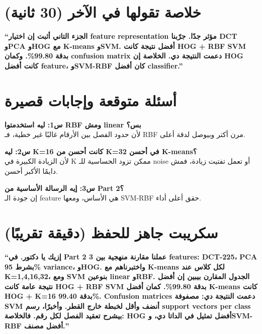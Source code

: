 \documentclass[12pt,a4paper]{article}
\begin{document}
\section*{خلاصة تقولها في الآخر (30 ثانية)}
\textbf{``الجزء التاني أثبت إن اختيار \textenglish{feature representation} مؤثر جدًا. جرّبنا \textenglish{DCT} و\textenglish{PCA} و\textenglish{HOG} مع \textenglish{K-means} و\textenglish{SVM}. أفضل نتيجة كانت \textenglish{HOG + RBF SVM} بدقة \textenglish{99.80\%}. وكمان \textenglish{confusion matrix} دعمت النتيجة دي. الخلاصة إن \textenglish{HOG} كانت أفضل \textenglish{feature}، و\textenglish{SVM-RBF} كان أفضل \textenglish{classifier}.''}

\section*{أسئلة متوقعة وإجابات قصيرة}
\textbf{س1: ليه استخدمتوا \textenglish{RBF} ومش \textenglish{linear} بس؟}\\
لأن حدود الفصل بين الأرقام غالبًا غير خطية، فـ \textenglish{RBF} مرن أكتر وبيوصل لدقة أعلى.

\textbf{س2: ليه \textenglish{K=16} كانت أحسن من \textenglish{K=32} في أحسن \textenglish{K-means}؟}\\
لأن الزيادة الكبيرة في \textenglish{K} ممكن تزود الحساسية للـ \textenglish{noise} أو تعمل تفتيت زيادة، فمش دايمًا الأكبر أحسن.

\textbf{س3: إيه الرسالة الأساسية من \textenglish{Part 2}؟}\\
إن جودة الـ \textenglish{feature} هي الأساس، ومعها \textenglish{SVM-RBF} حقق أعلى أداء.

\section*{سكريبت جاهز للحفظ (دقيقة تقريبًا)}
\textbf{``إزيك يا دكتور. في \textenglish{Part 2} عملنا مقارنة منهجية بين 3 \textenglish{features}: \textenglish{DCT-225}، \textenglish{PCA} بشرط \textenglish{95\% variance}، و\textenglish{HOG}. واختبرناهم مع \textenglish{K-means} لكل كلاس عند \textenglish{K=1,4,16,32}، ومع \textenglish{SVM} بنوعين \textenglish{linear} و\textenglish{RBF}. الجدول المقارن بيبين إن أفضل نتيجة عامة كانت \textenglish{HOG + RBF SVM} بدقة \textenglish{99.80\%}. كمان أفضل \textenglish{K-means} كانت \textenglish{HOG + K=16} بدقة \textenglish{99.40\%}. \textenglish{Confusion matrices} دعمت النتيجة دي: مصفوفة \textenglish{SVM} أنضف وأقل لخبطة خارج القطر. وأخيرًا، رسم \textenglish{support vectors per class} بيشرح تعقيد الفصل لكل رقم. فالخلاصة: \textenglish{HOG} أفضل تمثيل في الداتا دي، و\textenglish{SVM-RBF} أفضل مصنف.''}
\end{document}
